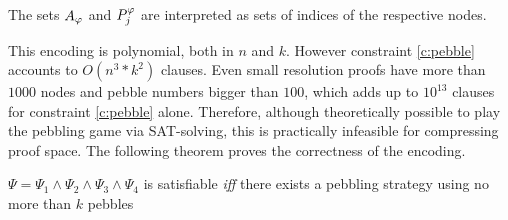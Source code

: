 The sets $A_{\varphi}$ and $P_{j}^{\varphi}$ are interpreted as sets of indices of the respective nodes.

\noindent
This encoding is polynomial, both in $n$ and $k$. However constraint \ref{c:pebble} accounts to $O(n^3*k^2)$ clauses. 
Even small resolution proofs have more than $1000$ nodes and pebble numbers bigger than $100$, which adds up to $10^{13}$ clauses for constraint \ref{c:pebble} alone. 
Therefore, although theoretically possible to play the pebbling game via SAT-solving, this is practically infeasible for compressing proof space.
The following theorem proves the correctness of the encoding.

\begin{theorem}

$\Psi = \Psi_1 \wedge \Psi_2 \wedge \Psi_3 \wedge \Psi_4$ is satisfiable \emph{iff} there exists a pebbling strategy using no more than $k$ pebbles

\end{theorem}

